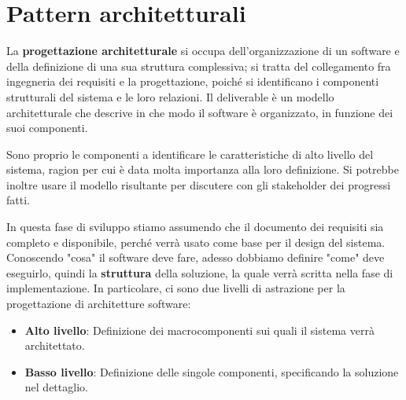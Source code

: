 \section{Pattern architetturali}
La \textbf{progettazione architetturale} si occupa dell'organizzazione di un software e della definizione di una sua struttura complessiva; si tratta
del collegamento fra ingegneria dei requisiti e la progettazione, poiché si identificano i componenti strutturali del sistema e le loro relazioni. Il
deliverable è un modello architetturale che descrive in che modo il software è organizzato, in funzione dei suoi componenti.\par
Sono proprio le componenti a identificare le caratteristiche di alto livello del sistema, ragion per cui è data molta importanza alla loro definizione.
Si potrebbe inoltre usare il modello risultante per discutere con gli stakeholder dei progressi fatti.\newline

\noindent In questa fase di sviluppo stiamo assumendo che il documento dei requisiti sia completo e disponibile, perché verrà usato come base per il
design del sistema. Conoscendo "cosa" il software deve fare, adesso dobbiamo definire "come" deve eseguirlo, quindi la \textbf{struttura} della
soluzione, la quale verrà scritta nella fase di implementazione. In particolare, ci sono due livelli di astrazione per la progettazione di architetture
software: \begin{itemize}
	\item \textbf{Alto livello}: Definizione dei macrocomponenti sui quali il sistema verrà architettato.
	\item \textbf{Basso livello}: Definizione delle singole componenti, specificando la soluzione nel dettaglio.
\end{itemize}

